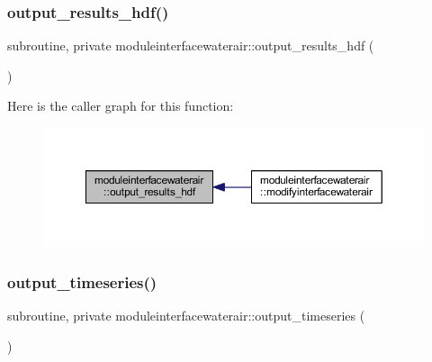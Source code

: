 \subsubsection{\texorpdfstring{output\+\_\+results\+\_\+hdf()}{output\_results\_hdf()}}
{\footnotesize\ttfamily subroutine, private moduleinterfacewaterair\+::output\+\_\+results\+\_\+hdf (\begin{DoxyParamCaption}{ }\end{DoxyParamCaption})\hspace{0.3cm}{\ttfamily [private]}}

Here is the caller graph for this function\+:\nopagebreak
\begin{figure}[H]
\begin{center}
\leavevmode
\includegraphics[width=350pt]{namespacemoduleinterfacewaterair_af0bc1dab0d7eafb5b7f4996d24e4d0bf_icgraph}
\end{center}
\end{figure}
\mbox{\label{namespacemoduleinterfacewaterair_a739b5f50c0652ff91c9f777fbf68729f}} 
\subsubsection{\texorpdfstring{output\+\_\+timeseries()}{output\_timeseries()}}
{\footnotesize\ttfamily subroutine, private moduleinterfacewaterair\+::output\+\_\+timeseries (\begin{DoxyParamCaption}{ }\end{DoxyParamCaption})\hspace{0.3cm}{\ttfamily [private]}}

